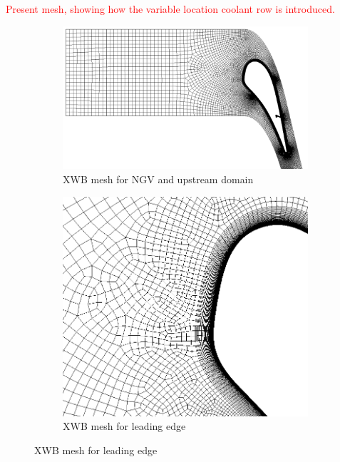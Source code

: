 \documentclass[a4paper, 11pt, twoside]{report}
\begin{document}
\textcolor{red}{Present mesh, showing how the variable location coolant row is introduced.}
\begin{figure}[H]
  \centering
  \begin{subfigure}{.9\textwidth}
    \centering
    \includegraphics[width=\linewidth]{figs/SCH_mesh_domain_placeholder.png}
    \caption{XWB mesh for NGV and upstream domain}
    \label{fig:SCH_mesh_1}
  \end{subfigure}
  \vspace{0.05\textwidth}
  \begin{subfigure}{.45\textwidth}
    \centering
    \includegraphics[width=\linewidth]{figs/SCH_mesh_leading_edge_placeholder.png}
    \caption{XWB mesh for leading edge}
    \label{fig:SCH_mesh_2}

\end{subfigure}
\end{figure}
\end{document}
